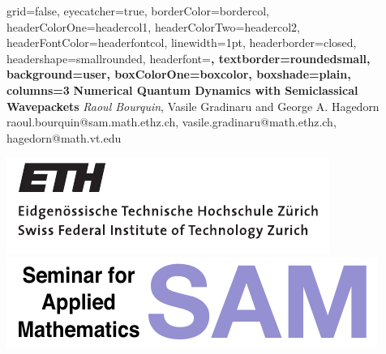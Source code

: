 \documentclass[b0paper,portrait,fontscale=0.24]{baposter}
\begin{document}
\begin{poster}{
    grid=false,
    eyecatcher=true,
    borderColor=bordercol,
    headerColorOne=headercol1,
    headerColorTwo=headercol2,
    headerFontColor=headerfontcol,
    linewidth=1pt,
    headerborder=closed,
    headershape=smallrounded,
    headerfont=\Large\sf\bf,
    textborder=roundedsmall,
    background=user,
    boxColorOne=boxcolor,
    boxshade=plain,
    columns=3
  }
  {
  }
  {
    {\sf\bf
      Numerical Quantum Dynamics with Semiclassical Wavepackets
    }
  }
  {
    \vspace{2pt}
    \textit{Raoul Bourquin}, Vasile Gradinaru and George A. Hagedorn\\
    {\small raoul.bourquin@sam.math.ethz.ch,
      vasile.gradinaru@math.ethz.ch,
      hagedorn@math.vt.edu
    }
  }
  {
    \begin{minipage}{14em}
      \includegraphics[scale=0.65]{ETH_Logo} \\
      \includegraphics[scale=0.5]{SAM_Logo}
    \end{minipage}
  }



\end{poster}
\end{document}
